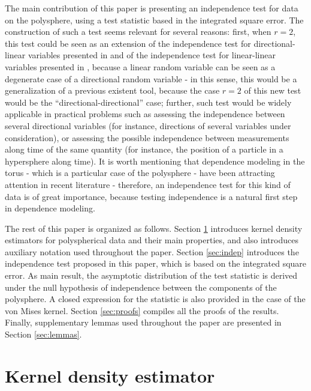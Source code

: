 \documentclass[oneside,11pt]{article}
\begin{document}
The main contribution of this paper is presenting an independence test for data on the polysphere, using a test statistic based in the integrated square error. The construction of such a test seems relevant for several reasons: first, when $r=2$, this test could be seen as an extension of the independence test for directional-linear variables presented in \cite{Garcia-Portugues2015} and of the independence test for linear-linear variables presented in \cite{rosenblatt1992nonparametric}, because a linear random variable can be seen as a degenerate case of a directional random variable - in this sense, this would be a generalization of a previous existent tool, because the case $r=2$ of this new test would be the ``directional-directional'' case; further, such test would be widely applicable in practical problems such as assessing the independence between several directional variables (for instance, directions of several variables under consideration), or assessing the possible independence between measurements along time of the same quantity (for instance, the position of a particle in a hypersphere along time). It is worth mentioning that dependence modeling in the torus - which is a particular case of the polysphere - have been attracting attention in recent literature \citep[e.g.,][]{Carnicero2013, Fernandez-Duran2007, Jones2015, Carnicero2018} - therefore, an independence test for this kind of data is of great importance, because testing independence is a natural first step in dependence modeling.

The rest of this paper is organized as follows. Section \ref{sec:kde} introduces kernel density estimators for polyspherical data and their main properties, and also introduces auxiliary notation used throughout the paper. Section \ref{sec:indep} introduces the independence test proposed in this paper, which is based on the integrated square error. As main result, the asymptotic distribution of the test statistic is derived under the null hypothesis of independence between the components of the polysphere. A closed expression for the statistic is also provided in the case of the von Mises kernel. Section \ref{sec:proofs} compiles all the proofs of the results. Finally, supplementary lemmas used throughout the paper are presented in Section \ref{sec:lemmas}.


\section{Kernel density estimator}
\label{sec:kde}
\end{document}
